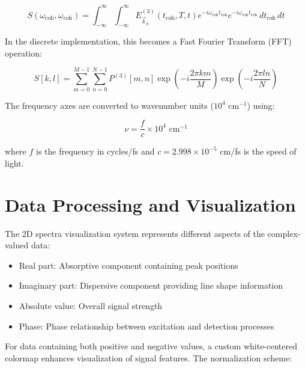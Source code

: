 \begin{equation}
	\label{eq:2d_fourier_transform}
	S(\omega_{\text{coh}}, \omega_{\text{coh}}) = \int_{-\infty}^{\infty} \int_{-\infty}^{\infty} E_{\vec{k}_{S}}^{(3)}(t_{\text{coh}}, T, t) e^{-i\omega_{\text{coh}} t_{\text{coh}}} e^{-i\omega_{\text{coh}} t_{\text{coh}}} \, dt_{\text{coh}} \, dt
\end{equation}

\noindent
In the discrete implementation, this becomes a Fast Fourier Transform (FFT) operation:

\begin{equation}
	\label{eq:discrete_2d_fft}
	S[k,l] = \sum_{m=0}^{M-1} \sum_{n=0}^{N-1} P^{(3)}[m,n] \exp\left(-i\frac{2\pi km}{M}\right) \exp\left(-i\frac{2\pi ln}{N}\right)
\end{equation}

\noindent
The frequency axes are converted to wavenumber units ($10^4$ cm$^{-1}$) using:

\begin{equation}
	\label{eq:frequency_to_wavenumber}
	\nu = \frac{f}{c} \times 10^4 \text{ cm}^{-1}
\end{equation}

\noindent
where $f$ is the frequency in cycles/fs and $c = 2.998 \times 10^{-5}$ cm/fs is the speed of light.

\section{Data Processing and Visualization}
\label{sec:data_visualization}

\noindent
The 2D spectra visualization system represents different aspects of the complex-valued data:

\begin{itemize}
	\item Real part: Absorptive component containing peak positions
	\item Imaginary part: Dispersive component providing line shape information
	\item Absolute value: Overall signal strength
	\item Phase: Phase relationship between excitation and detection processes
\end{itemize}

\noindent
For data containing both positive and negative values, a custom white-centered colormap enhances visualization of signal features. The normalization scheme:

